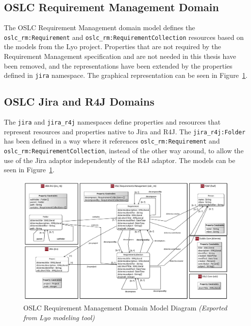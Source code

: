 \subsection*{OSLC Requirement Management Domain}
The OSLC Requirement Management domain model defines the \texttt{oslc\_rm:Requirement} and \texttt{oslc\_rm:RequirementCollection} resources based on the models from the Lyo project. Properties that are not required by the Requirement Management specification and are not needed in this thesis have been removed, and the representations have been extended by the properties defined in \texttt{jira} namespace. The graphical representation can be seen in Figure \ref{fig:oslc_rm_domain_model_diagram}.

\subsection*{OSLC Jira and R4J Domains}
The \texttt{jira} and \texttt{jira\_r4j} namespaces define properties and resources that represent resources and properties native to Jira and R4J. The \texttt{jira\_r4j:Folder} has been defined in a way where it references \texttt{oslc\_rm:Requirement} and \texttt{oslc\_rm:RequirementCollection}, instead of the other way around, to allow the use of the Jira adaptor independently of the R4J adaptor. The models can be seen in Figure \ref{fig:oslc_rm_domain_model_diagram}.

\begin{figure}[H]
  \centering
  \begin{sideways}
    \includegraphics[width=1.42\linewidth]{figures/Requirement_Management_Domain.jpg}
  \end{sideways}
  \caption{OSLC Requirement Management Domain Model Diagram \emph{(Exported from Lyo modeling tool)}}
  \label{fig:oslc_rm_domain_model_diagram}
\end{figure}

